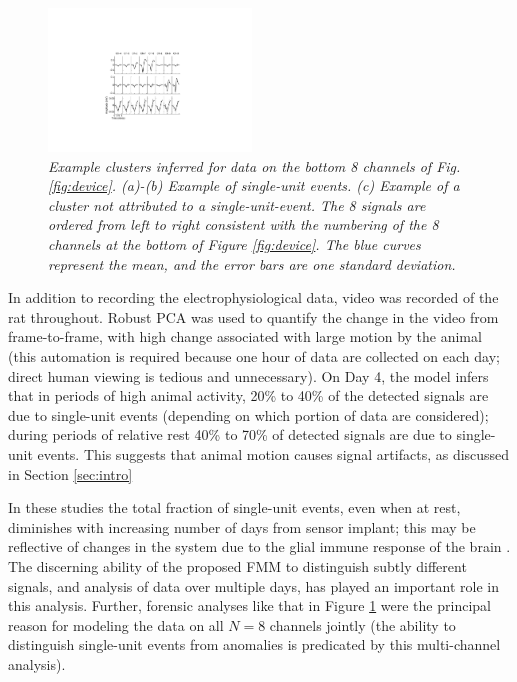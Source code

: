 \documentclass[journal]{IEEEtran}
\begin{document}
\begin{figure}[h!]
  \centering
    \includegraphics[width=0.48\textwidth]{figs_new/singleunits.pdf}
\caption{\label{fig:units}\small{\emph{Example
clusters inferred for data on the bottom 8 channels of Fig.
\ref{fig:device}. (a)-(b) Example of single-unit events. (c) Example
of a cluster \emph{not} attributed to a single-unit-event. The 8
signals are ordered from left to right consistent with the numbering
of the 8 channels at the bottom of Figure \ref{fig:device}. The blue curves represent the mean, and the error bars are one standard deviation.}}}
\label{fig:units}
\end{figure}
In addition to recording the electrophysiological data, video was recorded of the rat throughout. Robust PCA \cite{Wright09} was used to quantify the change in the video from frame-to-frame, with high change associated with large motion by the animal (this automation is required because one hour of data are collected on each day; direct human viewing is tedious and unnecessary). On Day 4, the model infers that in periods of high animal activity, 20\% to 40\% of the detected signals are due to single-unit events (depending on which portion of data are considered); during periods of relative rest 40\% to 70\% of detected signals are due to single-unit events. This suggests that animal motion causes signal artifacts, as discussed in Section \ref{sec:intro}

In these studies the total fraction of single-unit events, even when at rest, diminishes with increasing number of days from sensor implant; this may be reflective of changes in the system due to the glial immune response of the brain \cite{Biran,Szarowski03}. The discerning ability of the proposed FMM to distinguish subtly different signals, and analysis of data over multiple days, has played an important role in this analysis. Further, forensic analyses like that in Figure \ref{fig:units} were the principal reason for modeling the data on all $N=8$ channels jointly (the ability to distinguish single-unit events from anomalies is predicated by this multi-channel analysis).
\end{document}

